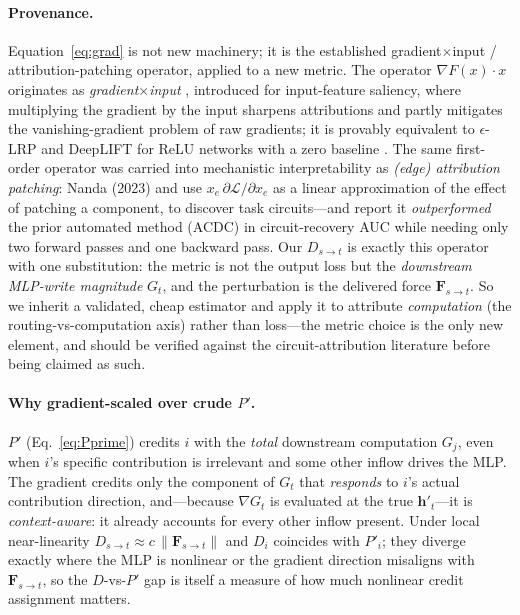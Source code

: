 \documentclass[11pt]{article}
\newcommand{\F}{\mathbf{F}}
\newcommand{\hh}{\mathbf{h}}
\newcommand{\norm}[1]{\left\lVert #1 \right\rVert}
\begin{document}
\paragraph{Provenance.} Equation~\eqref{eq:grad} is not new machinery; it is the established
gradient$\times$input / attribution-patching operator, applied to a new metric. The operator
$\nabla F(x)\cdot x$ originates as \emph{gradient$\times$input} \cite{shrikumar2017learning}, introduced
for input-feature saliency, where multiplying the gradient by the input sharpens attributions and
partly mitigates the vanishing-gradient problem of raw gradients; it is provably equivalent to
$\epsilon$-LRP and DeepLIFT for ReLU networks with a zero baseline \cite{ancona2018towards}. The same
first-order operator was carried into mechanistic interpretability as \emph{(edge) attribution
patching}: Nanda (2023) and \cite{syed2023attribution} use $x_e\,\partial \mathcal L/\partial x_e$ as a
linear approximation of the effect of patching a component, to discover task circuits---and report it
\emph{outperformed} the prior automated method (ACDC) in circuit-recovery AUC while needing only two
forward passes and one backward pass. Our $D_{s\to t}$ is exactly this operator with one substitution:
the metric is not the output loss but the \emph{downstream MLP-write magnitude} $G_t$, and the
perturbation is the delivered force $\F_{s\to t}$. So we inherit a validated, cheap estimator and apply
it to attribute \emph{computation} (the routing-vs-computation axis) rather than loss---the metric
choice is the only new element, and should be verified against the circuit-attribution literature
before being claimed as such.

\paragraph{Why gradient-scaled over crude $P'$.}
$P'$ (Eq.~\ref{eq:Pprime}) credits $i$ with the \emph{total} downstream computation $G_j$, even when
$i$'s specific contribution is irrelevant and some other inflow drives the MLP. The gradient credits
only the component of $G_t$ that \emph{responds} to $i$'s actual contribution direction, and---because
$\nabla G_t$ is evaluated at the true $\hh'_t$---it is \emph{context-aware}: it already accounts for
every other inflow present. Under local near-linearity $D_{s\to t}\!\approx\!c\,\norm{\F_{s\to t}}$ and
$D_i$ coincides with $P'_i$; they diverge exactly where the MLP is nonlinear or the gradient direction
misaligns with $\F_{s\to t}$, so the $D$-vs-$P'$ gap is itself a measure of how much nonlinear credit
assignment matters.
\end{document}
